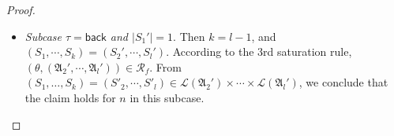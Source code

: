 \documentclass[preprint,12pt]{elsarticle}
\newcommand\Pp{{\mathcal{P} }}
\newcommand\act{{\sf Act}}
\newcommand\back{{\mathsf{back} }}
\newcommand\post{{\mathsf{post} }}
\newcommand\AutReach{\mathscr{R}}
\newcommand{\STK}{\mathsf{STK}}
\newcommand{\SIT}{\mathsf{SIT}}
\newcommand\Aut{{\mathfrak{A} }}
\newcommand\Lang{{\mathscr{L} }}
\begin{document}
\begin{proof}
{\begin{itemize}
\begin{itemize}
$$\begin{array}{l}
            \end{array}
            $$  
            we conclude that the claim holds for $n$ in this subcase. 
            \item if $S_i' \in \Lang(\Aut_i') = \Lang(\Aut_{A_0\stackrel{C}\rightsquigarrow D})$ for some $C\in\Gamma_{A_0}\setminus\{A_0'\}$, $D\in\Gamma_{A_0}$, moreover $B' = A_0'$, $S_i' = S\cdot [A_0]\cdot S'$ for some $S,S'\in\Gamma_{A_0}^*$ with $A_0'\notin S$, $S_1' \in \Lang(\Aut_{A\rightsquigarrow B})$ for some $A\in\act_\STK\cup\act_\SIT$, $S_1 = [A_0]\cdot S'$, $(S_2, \dots, S_k) = (S'_1, \dots, S'_{i-1}, S'_{i+1}, \dots, S'_l)$. According to the 2nd saturation rule, we know that 
            $$(\theta, (\Aut_{A_0\stackrel{C}\rightsquigarrow A_0'}, \Aut_1',\cdots, \Aut_{i-1}', \Aut_{i+1}', \cdots, \Aut_{l}')) \in \AutReach_f.$$
            From 
            $\Lang(\Aut_{A_0\stackrel{C}\rightsquigarrow A_0'}) = \{[A_0']\cdot S\mid S'\cdot[A_0']\cdot S\in\Lang(\Aut_{A_0\stackrel{C}\rightsquigarrow D})\}$,
            we know that $[A_0']\cdot S'\in\Lang(\Aut_{A_0\stackrel{C}\rightsquigarrow A_0'})$. From
            $$
            \begin{array}{l}
                (S_1,\cdots,S_k) = ([A_0']\cdot S', S_1', \cdots, S_{i-1}', S_{i+1}', \cdots, S_l') \in \\
                \ \ \Lang(\Aut_{A_0\stackrel{C}\rightsquigarrow A_0'}) \times \Lang(\Aut_1') \times \cdots \times \Lang(\Aut_{i-1}') \times \Lang(\Aut_{i+1}')\times \cdots \times \Lang(\Aut_{l}'),
            \end{array}
            $$  
            we conclude that the claim holds for $n$ in this subcase. 
        \end{itemize}
        \item \emph{Subcase $\tau = \back$ and $|S_1'|=1$}. Then $k = l - 1$, and $(S_1,\cdots,S_k) = (S_2',\cdots,S_l')$.  According to the 3rd saturation rule, $(\theta, (\Aut_2',\cdots,\Aut_l')) \in \AutReach_f$. From $(S_1,\dots,S_k) = (S'_2, \cdots, S'_l) \in \Lang(\Aut_2') \times \cdots \times \Lang(\Aut_l')$, we conclude that the claim holds for $n$ in this subcase. 
    \end{itemize}
}
%
    \end{proof}
\end{document}
